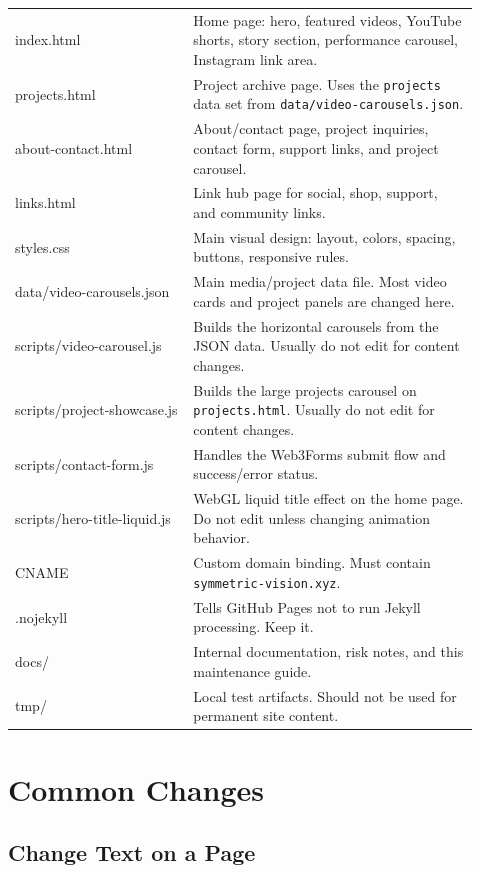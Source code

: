 \documentclass[11pt]{article}
\begin{document}
\begin{longtable}{>{\ttfamily}p{0.35\linewidth}p{0.57\linewidth}}
index.html & Home page: hero, featured videos, YouTube shorts, story section, performance carousel, Instagram link area.\\
projects.html & Project archive page. Uses the \texttt{projects} data set from \texttt{data/video-carousels.json}.\\
about-contact.html & About/contact page, project inquiries, contact form, support links, and project carousel.\\
links.html & Link hub page for social, shop, support, and community links.\\
styles.css & Main visual design: layout, colors, spacing, buttons, responsive rules.\\
data/video-carousels.json & Main media/project data file. Most video cards and project panels are changed here.\\
scripts/video-carousel.js & Builds the horizontal carousels from the JSON data. Usually do not edit for content changes.\\
scripts/project-showcase.js & Builds the large projects carousel on \texttt{projects.html}. Usually do not edit for content changes.\\
scripts/contact-form.js & Handles the Web3Forms submit flow and success/error status.\\
scripts/hero-title-liquid.js & WebGL liquid title effect on the home page. Do not edit unless changing animation behavior.\\
CNAME & Custom domain binding. Must contain \texttt{symmetric-vision.xyz}.\\
.nojekyll & Tells GitHub Pages not to run Jekyll processing. Keep it.\\
docs/ & Internal documentation, risk notes, and this maintenance guide.\\
tmp/ & Local test artifacts. Should not be used for permanent site content.\\
\end{longtable}

\section{Common Changes}

\subsection{Change Text on a Page}
\end{document}
